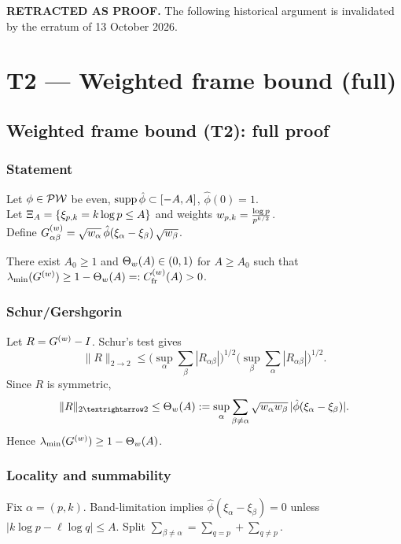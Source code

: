 \par\noindent\textbf{RETRACTED AS PROOF.} The following historical argument is invalidated by the erratum of 13 October 2026.\par
\section{T2 — Weighted frame bound (full)}

\subsection{Weighted frame bound (T2): full proof}\label{sec:T2-full}

\subsubsection{Statement}
Let $\phi\in\mathcal{PW}$ be even, $\operatorname{supp}\hat\phi\subset[-A,A]$, $\hat\phi(0)=1$. \\
Let $\Xi_A=\{\xi_{p,k}=k\log p\le A\}$ and weights $w_{p,k}=\frac{\log p}{p^{k/2}}$. \\
Define $G^{(w)}_{\alpha\beta}=\sqrt{w_\alpha}\,\hat\phi(\xi_\alpha-\xi_\beta)\,\sqrt{w_\beta}$.

\begin{theorem}\label{thm:T2-full}
There exist $A_0\ge 1$ and $\Theta_w(A)\in(0,1)$ for $A\ge A_0$ such that
$\lambda_{\min}(G^{(w)})\ge 1-\Theta_w(A)=:C_{\mathrm{fr}}^{(w)}(A)>0$.
\end{theorem}

\subsubsection{Schur/Gershgorin}
Let $R=G^{(w)}-I$. Schur’s test gives
\[
\|R\|_{2\to2}\le\Big(\sup_\alpha\sum_\beta |R_{\alpha\beta}|\Big)^{1/2}
\Big(\sup_\beta\sum_\alpha |R_{\alpha\beta}|\Big)^{1/2}.
\]
Since $R$ is symmetric,
\[
\|R\|_{2\to2}\le \Thetaw(A):=\sup_\alpha \sum_{\beta\ne\alpha}\sqrt{w_\alpha w_\beta}\,|\hat\phi(\xi_\alpha-\xi_\beta)|.
\]
Hence $\lambda_{\min}(G^{(w)})\ge 1-\Theta_w(A)$.

\subsubsection{Locality and summability}
Fix $\alpha=(p,k)$. Band-limitation implies $\hat\phi(\xi_\alpha-\xi_\beta)=0$ unless $|k\log p-\ell\log q|\le A$.
Split $\sum_{\beta\ne\alpha}=\sum_{q=p}+\sum_{q\ne p}$.

